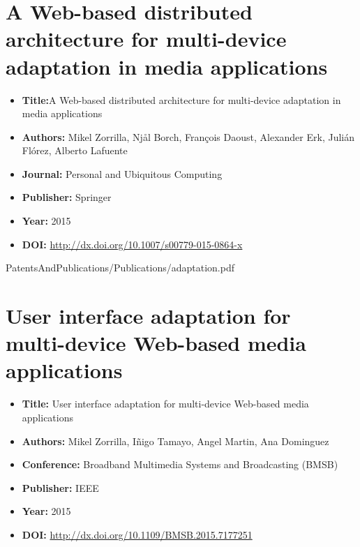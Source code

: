 \newcommand{\PublicationsPath}{PatentsAndPublications/Publications}


\chapter[A Web-based architecture for multi-device adaptation]{A Web-based distributed architecture for multi-device adaptation in media applications}
\label{chap:PUC2015}
\begin{itemize} \itemsep1pt\parskip0pt
	\item \textbf{Title:}A Web-based distributed architecture for multi-device adaptation in media applications
	\item \textbf{Authors:} Mikel Zorrilla, Njål Borch, François Daoust, Alexander Erk, Julián Flórez, Alberto Lafuente	
	\item \textbf{Journal:} Personal and Ubiquitous Computing
 	\item \textbf{Publisher:} Springer
	\item \textbf{Year:} 2015
	\item \textbf{DOI:}  \url{http://dx.doi.org/10.1007/s00779-015-0864-x}
\end{itemize}	
	

\ifattachpapers
	 {\PublicationsPath/adaptation.pdf}
\fi


\chapter[User interface adaptation for multi-device Web-based media]{User interface adaptation for multi-device Web-based media applications}
\label{chap:BMSB2015}
\begin{itemize} \itemsep1pt\parskip0pt
	\item \textbf{Title:} User interface adaptation for multi-device Web-based media applications
	\item \textbf{Authors:} Mikel Zorrilla, Iñigo Tamayo, Angel Martin, Ana Dominguez	
	\item \textbf{Conference:} Broadband Multimedia Systems and Broadcasting (BMSB)
 	\item \textbf{Publisher:} IEEE
	\item \textbf{Year:} 2015
	\item \textbf{DOI:}  \url{http://dx.doi.org/10.1109/BMSB.2015.7177251}
\end{itemize}	
	

